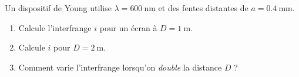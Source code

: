 \documentclass[11pt,a4paper]{article}
\begin{document}
\begin{exo}
Un dispositif de Young utilise $\lambda=\SI{600}{\nano\metre}$ et des fentes distantes de
$a=\SI{0.4}{\milli\metre}$.
\begin{enumerate}[label=\alph*)]
  \item Calcule l'interfrange $i$ pour un écran à $D=\SI{1}{\metre}$.
  \item Calcule $i$ pour $D=\SI{2}{\metre}$.
  \item Comment varie l'interfrange lorsqu'on \emph{double} la distance $D$ ?
\end{enumerate}
\end{exo}
\end{document}
